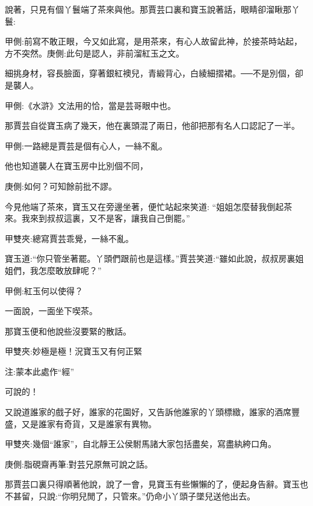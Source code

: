 \begin{parag}
    說著，只見有個丫鬟端了茶來與他。那賈芸口裏和寶玉說著話，眼睛卻溜瞅那丫鬟:\begin{note}甲側:前寫不敢正眼，今又如此寫，是用茶來，有心人故留此神，於接茶時站起，方不突然。庚側:此句是認人，非前溜紅玉之文。\end{note}細挑身材，容長臉面，穿著銀紅襖兒，青緞背心，白綾細摺裙。──不是別個，卻是襲人。\begin{note}甲側:《水滸》文法用的恰，當是芸哥眼中也。\end{note}那賈芸自從寶玉病了幾天，他在裏頭混了兩日，他卻把那有名人口認記了一半。\begin{note}甲側:一路總是賈芸是個有心人，一絲不亂。\end{note}他也知道襲人在寶玉房中比別個不同，\begin{note}庚側:如何？可知餘前批不謬。\end{note}今見他端了茶來，寶玉又在旁邊坐著，便忙站起來笑道: “姐姐怎麼替我倒起茶來。我來到叔叔這裏，又不是客，讓我自己倒罷。”\begin{note}甲雙夾:總寫賈芸乖覺，一絲不亂。\end{note}寶玉道:“你只管坐著罷。丫頭們跟前也是這樣。”賈芸笑道:“雖如此說，叔叔房裏姐姐們，我怎麼敢放肆呢？”\begin{note}甲側:紅玉何以使得？\end{note}一面說，一面坐下喫茶。
\end{parag}


\begin{parag}
    那寶玉便和他說些沒要緊的散話。\begin{note}甲雙夾:妙極是極！況寶玉又有何正緊\begin{subnote}注:蒙本此處作“經”\end{subnote}可說的！\end{note}又說道誰家的戲子好，誰家的花園好，又告訴他誰家的丫頭標緻，誰家的酒席豐盛，又是誰家有奇貨，又是誰家有異物。\begin{note}甲雙夾:幾個“誰家”，自北靜王公侯駙馬諸大家包括盡矣，寫盡紈絝口角。\end{note}\begin{note}庚側:脂硯齋再筆:對芸兄原無可說之話。\end{note}那賈芸口裏只得順著他說，說了一會，見寶玉有些懶懶的了，便起身告辭。寶玉也不甚留，只說:“你明兒閒了，只管來。”仍命小丫頭子墜兒送他出去。
\end{parag}


